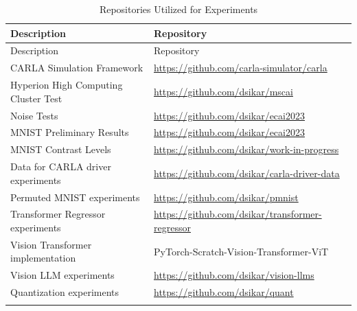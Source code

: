 \begin{longtable}{@{}ll@{}}
\toprule
Description & Repository \\
\midrule
\endfirsthead
\toprule
Description & Repository \\
\midrule
\endhead
CARLA Simulation Framework & \url{https://github.com/carla-simulator/carla} \\
Hyperion High Computing Cluster Test & \url{https://github.com/dsikar/mscai} \\
Noise Tests & \url{https://github.com/dsikar/ecai2023} \\
MNIST Preliminary Results & \url{https://github.com/dsikar/ecai2023} \\
MNIST Contrast Levels & \url{https://github.com/dsikar/work-in-progress} \\
Data for CARLA driver experiments & \url{https://github.com/dsikar/carla-driver-data} \\
Permuted MNIST experiments & \url{https://github.com/dsikar/pmnist} \\
Transformer Regressor experiments & \url{https://github.com/dsikar/transformer-regressor} \\
Vision Transformer implementation & PyTorch-Scratch-Vision-Transformer-ViT \\
Vision LLM experiments & \url{https://github.com/dsikar/vision-llms} \\
Quantization experiments & \url{https://github.com/dsikar/quant} \\
\bottomrule
\caption{Repositories Utilized for Experiments}
\label{tab:thesis_repositories}
\end{longtable}

